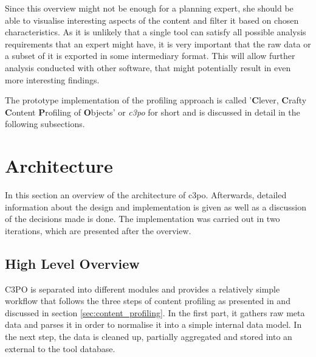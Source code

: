 Since this overview might not be enough for a planning expert, she should be able to visualise interesting aspects of the content and filter it based on chosen characteristics. As it is unlikely that a single tool can satisfy all possible analysis requirements that an expert might have, it is very important that the raw data or a subset of it is exported in some intermediary format. This will allow further analysis conducted with other software, that might potentially result in even more interesting findings. 


The prototype implementation of the profiling approach is called '\textbf{C}lever, \textbf{C}rafty \textbf{C}ontent \textbf{P}rofiling of \textbf{O}bjects' or \textit{c3po} for short and is discussed in detail in the following subsections.

\section{Architecture}
In this section an overview of the architecture of c3po. Afterwards, detailed information about the design and implementation is given as well as a discussion of the decisions made is done. The implementation was carried out in two iterations, which are presented after the overview.

\subsection{High Level Overview}
C3PO is separated into different modules and provides a relatively simple workflow that follows the three steps of content profiling as presented in \cite{petrov-ipres2012} and discussed in section \ref{sec:content_profiling}. In the first part, it gathers raw meta data and parses it in order to normalise it into a simple internal data model. In the next step, the data is cleaned up, partially aggregated and stored into an external to the tool database. 


